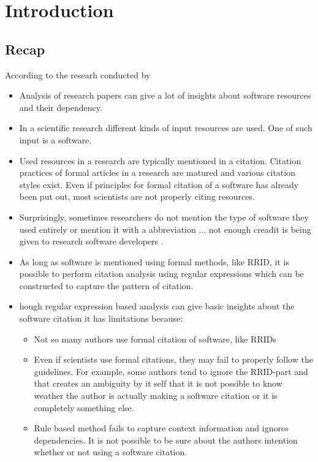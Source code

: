 \section{Introduction}

\subsection{Recap}

According to the researh conducted by \cite{}

\begin{itemize}
    \item Analysis of research papers can give a lot of insights about software resources and their dependency. 
    \item In a scientific research different kinds of input resources are used. One of such input is a software. 
    \item Used resources in a research are typically mentioned in a citation. Citation practices of formal articles in a research are matured and various citation styles exist. Even if principles  for formal citation of a software has already been put out, most scientists are not properly citing resources.  
	\item Surprisingly, sometimes researchers do not mention the type of software they used entirely or mention it with a abbreviation ... not enough creadit is being given to research software developers .
	\item As long as software is mentioned using formal methods, like RRID, it is possible to perform citation analysis using regular expressions which can be constructed to capture the pattern of citation.
	\item hough regular expression based analysis can give basic insights about the software citation it has limitations because:
			
			\begin{itemize}
				\item Not so many authors use formal citation of software, like RRIDs
				\item Even if scientists use formal citations, they may fail to properly follow the guidelines. For example, some authors tend to ignore the RRID-part and that creates an ambiguity by it self that it is not possible to know weather the author is actually making a software citation or it is completely something else. 
				\item Rule based method fails to capture context information and ignores dependencies. It is not possible to be sure about the authors intention whether or not using a software citation. 


\end{itemize}
\end{itemize}
